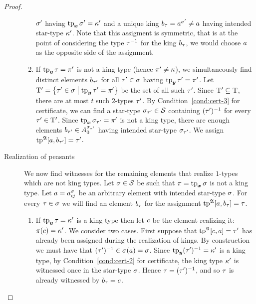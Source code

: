 \begin{proof}
\begin{description}
\begin{enumerate}
  $\sigma'$ having $\operatorname{tp}_{\bm{x}}\sigma' = \kappa'$ and a unique king $b_\tau =
  a^{\sigma'} \neq a$ having intended star-type ${\kappa'}$. Note that this
  assigment is symmetric, that is at the point of considering the type
  $\tau^{-1}$ for the king $b_\tau$, we would choose $a$ as the
  opposite side of the assignment.
  \item If $\operatorname{tp}_{\bm{y}}\tau = {\pi'}$ is not a king type (hence
  ${\pi'} \neq \kappa$), we simultaneously find distinct elements $b_{\tau'}$ for all ${\tau'} \in
  \sigma$ having $\operatorname{tp}_{\bm{y}}{\tau'} = {\pi'}$.
  Let ${\mathrm{T}'} = \left\{{\tau'} \in \sigma\mathrel{}\middle|\mathrel{}\operatorname{tp}_{\bm{y}}{\tau'} = {\pi'}\right\}$ be the set of
  all such ${\tau'}$.
  Since ${\mathrm{T}'} \subseteq \mathrm{T}$, there are
  at most $t$ such $2$-types ${\tau'}$. By Condition~\ref{cond:cert-3} for
  certificate, we can find a star-type $\sigma_{{\tau'}} \in \mathcal{S}$ containing
  $({\tau'})^{-1}$ for every ${\tau'} \in {\mathrm{T}'}$. Since $\operatorname{tp}_{\bm{x}}\sigma_{{\tau'}} =
  {\pi'}$ is not a king type, there are enough elements 
  $b_{{\tau'}} \in A_0^{\sigma_{{\tau'}}}$ having intended star-type
  $\sigma_{{\tau'}}$.
  We assign $\operatorname{tp}^{\mathfrak{A}}[a,b_{\tau'}] = {\tau'}$.
  \end{enumerate}
  \item[Realization of peasants] We now find witnesses for the remaining
  elements that realize $1$-types which are not king types. Let $\sigma \in \mathcal{S}$ be such that $\pi =
  \operatorname{tp}_{\bm{x}}\sigma$ is not a king type. Let $a = a_{ij}^\sigma$ be an arbitrary element
  with intended star-type $\sigma$. For every $\tau \in \sigma$ we will find an
  element $b_\tau$ for the assignment $\operatorname{tp}^{\mathfrak{A}}[a,b_\tau] = \tau$.
  \begin{enumerate}
    \item If $\operatorname{tp}_{\bm{y}}\tau = {\kappa'}$ is a king type then let $c$ be the element
    realizing it: $\pi(c) = {\kappa'}$.
    We consider two cases.
    First suppose that $\operatorname{tp}^{\mathfrak{A}}[c,a] = {\tau'}$ has already been assigned
    during the realization of kings.
    By construction we must have that $({\tau'})^{-1} \in \sigma(a) = \sigma$.
    Since $\operatorname{tp}_{\bm{y}}({\tau'})^{-1} = {\kappa'}$ is a king type,
    by Condition~\ref{cond:cert-2}
    for certificate, the king type ${\kappa'}$ is witnessed once in the star-type
    $\sigma$. Hence $\tau = (\tau')^{-1}$, and so $\tau$ is already witnessed
    by $b_\tau = c$.
    

\end{enumerate}
\end{description}
\end{proof}
